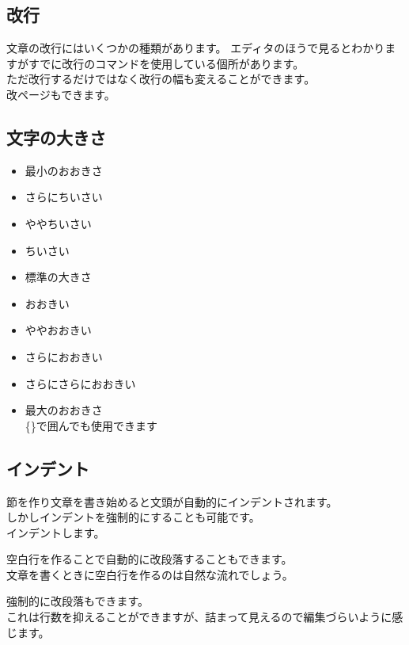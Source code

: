 \documentclass{jsarticle}					%
\begin{document}
\subsection{改行}
	文章の改行にはいくつかの種類があります。\newline
	エディタのほうで見るとわかりますがすでに改行のコマンドを使用している個所があります。\\
	ただ改行するだけではなく改行の幅も変えることができます。\\[5pt]
	改ページもできます。
	\pagebreak
		
\subsection{文字の大きさ}
	\begin{itemize}
		\tiny		\item 最小のおおきさ\\
		\scriptsize 	\item さらにちいさい\\
		\footnotesize \item ややちいさい\\
		\small 		\item ちいさい\\
		\normalsize 	\item 標準の大きさ\\
		\large 		\item おおきい\\
		\Large 		\item ややおおきい\\
		\LARGE 		\item さらにおおきい\\
		\huge 		\item さらにさらにおおきい\\
		\Huge 		\item 最大のおおきさ\\
		\normalsize {\small \{\}で囲んでも使用できます}
	\end{itemize}
	
\subsection{インデント}
	節を作り文章を書き始めると文頭が自動的にインデントされます。\\
	しかしインデントを強制的にすることも可能です。\\
	\indent インデントします。
	
	空白行を作ることで自動的に改段落することもできます。\\
	文章を書くときに空白行を作るのは自然な流れでしょう。
	\par 強制的に改段落もできます。\\
	これは行数を抑えることができますが、詰まって見えるので編集づらいように感じます。
	
\end{document}
